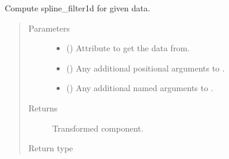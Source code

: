 \documentclass[letterpaper,10pt,english]{sphinxmanual}
\begin{document}
\begin{fulllineitems}
\begin{fulllineitems}
\label{\detokenize{api/states:geology.src.States.spline_filter1d}}
Compute spline\_filter1d for given data.
\begin{quote}\begin{description}
\item[{Parameters}] \leavevmode\begin{itemize}
\item {} 
 (\sphinxstyleliteralemphasis{\sphinxupquote{, }}) \textendash{} Attribute to get the data from.

\item {} 
 () \textendash{} Any additional positional arguments to .

\item {} 
 () \textendash{} Any additional named arguments to .

\end{itemize}

\item[{Returns}] \leavevmode
{} \textendash{} Transformed component.

\item[{Return type}] \leavevmode
{\hyperref[\detokenize{api/base_classes:geology.src.base_spatial.SpatialComponent}]{}}

\end{description}\end{quote}

\end{fulllineitems}



\end{fulllineitems}
\end{document}
